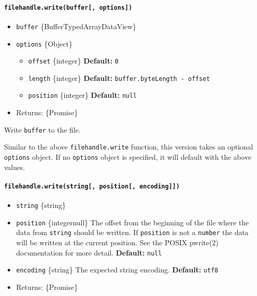 \paragraph{\texorpdfstring{\texttt{filehandle.write(buffer{[},\ options{]})}}{filehandle.write(buffer{[}, options{]})}}\label{filehandle.writebuffer-options}

\begin{itemize}
\tightlist
\item
  \texttt{buffer} \{Buffer\textbar TypedArray\textbar DataView\}
\item
  \texttt{options} \{Object\}

  \begin{itemize}
  \tightlist
  \item
    \texttt{offset} \{integer\} \textbf{Default:} \texttt{0}
  \item
    \texttt{length} \{integer\} \textbf{Default:}
    \texttt{buffer.byteLength\ -\ offset}
  \item
    \texttt{position} \{integer\} \textbf{Default:} \texttt{null}
  \end{itemize}
\item
  Returns: \{Promise\}
\end{itemize}

Write \texttt{buffer} to the file.

Similar to the above \texttt{filehandle.write} function, this version
takes an optional \texttt{options} object. If no \texttt{options} object
is specified, it will default with the above values.

\paragraph{\texorpdfstring{\texttt{filehandle.write(string{[},\ position{[},\ encoding{]}{]})}}{filehandle.write(string{[}, position{[}, encoding{]}{]})}}\label{filehandle.writestring-position-encoding}

\begin{itemize}
\tightlist
\item
  \texttt{string} \{string\}
\item
  \texttt{position} \{integer\textbar null\} The offset from the
  beginning of the file where the data from \texttt{string} should be
  written. If \texttt{position} is not a \texttt{number} the data will
  be written at the current position. See the POSIX pwrite(2)
  documentation for more detail. \textbf{Default:} \texttt{null}
\item
  \texttt{encoding} \{string\} The expected string encoding.
  \textbf{Default:} \texttt{\textquotesingle{}utf8\textquotesingle{}}
\item
  Returns: \{Promise\}
\end{itemize}

